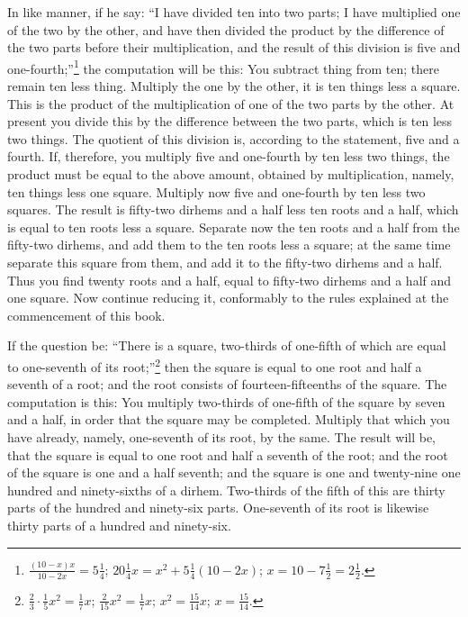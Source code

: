 In like manner, if he say: ``I have divided ten into two parts; I have multiplied one of the two by the other, and have then divided the product by the difference of the two parts before their multiplication, and the result of this division is five and one-fourth;''\footnote{$\frac{(10-x)x}{10-2x} = 5\frac{1}{4}$; $20\frac{1}{4}x = x^2 + 5\frac{1}{4}(10-2x)$; $x = 10 - 7\frac{1}{2} = 2\frac{1}{2}$.} the computation will be this: You subtract thing from ten; there remain ten less thing. Multiply the one by the other, it is ten things less a square. This is the product of the multiplication of one of the two parts by the other. At present you divide this by the difference between the two parts, which is ten less two things. The quotient of this division is, according to the statement, five and a fourth. If, therefore, you multiply five and one-fourth by ten less two things, the product must be equal to the above amount, obtained by multiplication, namely, ten things less one square. Multiply now five and one-fourth by ten less two squares. The result is fifty-two dirhems and a half less ten roots and a half, which is equal to ten roots less a square. Separate now the ten roots and a half from the fifty-two dirhems, and add them to the ten roots less a square; at the same time separate this square from them, and add it to the fifty-two dirhems and a half. Thus you find twenty roots and a half, equal to fifty-two dirhems and a half and one square. Now continue reducing it, conformably to the rules explained at the commencement of this book.

If the question be: ``There is a square, two-thirds of one-fifth of which are equal to one-seventh of its root;''\footnote{$\frac{2}{3} \cdot \frac{1}{5}x^2 = \frac{1}{7}x$; $\frac{2}{15}x^2 = \frac{1}{7}x$; $x^2 = \frac{15}{14}x$; $x = \frac{15}{14}$.} then the square is equal to one root and half a seventh of a root; and the root consists of fourteen-fifteenths of the square. The computation is this: You multiply two-thirds of one-fifth of the square by seven and a half, in order that the square may be completed. Multiply that which you have already, namely, one-seventh of its root, by the same. The result will be, that the square is equal to one root and half a seventh of the root; and the root of the square is one and a half seventh; and the square is one and twenty-nine one hundred and ninety-sixths of a dirhem. Two-thirds of the fifth of this are thirty parts of the hundred and ninety-six parts. One-seventh of its root is likewise thirty parts of a hundred and ninety-six.

